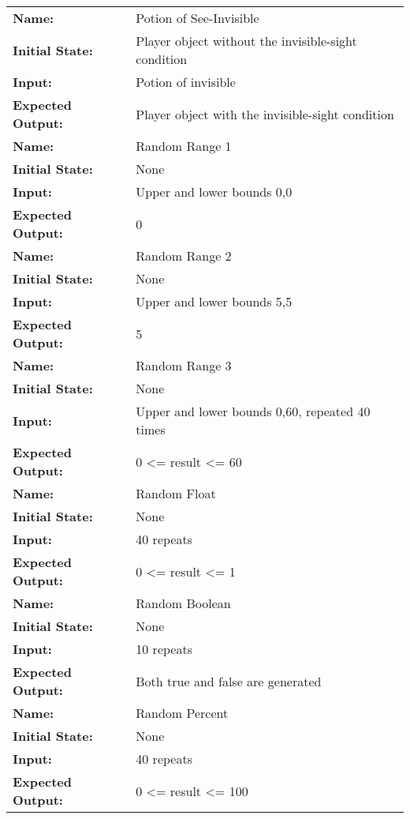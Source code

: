 \documentclass[12pt, titlepage]{article}
\begin{document}
\begin{center}
\begin{longtable}{ l | p{10cm} }
				\hline
				\rule{0pt}{2em}\textbf{Name:} & Potion of See-Invisible\\
				\textbf{Initial State:} & Player object without the invisible-sight condition\\
				\textbf{Input:} & Potion of invisible\\
				\textbf{Expected Output:} & Player object with the invisible-sight condition\\[1em]
				\hline
				\rule{0pt}{2em}\textbf{Name:} & Random Range 1\\
				\textbf{Initial State:} & None\\
				\textbf{Input:} & Upper and lower bounds 0,0\\
				\textbf{Expected Output:} & 0\\[1em]
				\hline
				\rule{0pt}{2em}\textbf{Name:} & Random Range 2\\
				\textbf{Initial State:} & None\\
				\textbf{Input:} & Upper and lower bounds 5,5\\
				\textbf{Expected Output:} & 5\\[1em]
				\hline
				\rule{0pt}{2em}\textbf{Name:} & Random Range 3\\
				\textbf{Initial State:} & None\\
				\textbf{Input:} & Upper and lower bounds 0,60, repeated 40 times\\
				\textbf{Expected Output:} & 0 <= result <= 60\\[1em]
				\hline
				\rule{0pt}{2em}\textbf{Name:} & Random Float\\
				\textbf{Initial State:} & None\\
				\textbf{Input:} & 40 repeats\\
				\textbf{Expected Output:} & 0 <= result <= 1\\[1em]
				\hline
				\rule{0pt}{2em}\textbf{Name:} & Random Boolean\\
				\textbf{Initial State:} & None\\
				\textbf{Input:} & 10 repeats\\
				\textbf{Expected Output:} & Both true and false are generated\\[1em]
				\hline
				\rule{0pt}{2em}\textbf{Name:} & Random Percent\\
				\textbf{Initial State:} & None\\
				\textbf{Input:} & 40 repeats\\
				\textbf{Expected Output:} & 0 <= result <= 100\\[1em]

\end{longtable}
\end{center}
\end{document}
